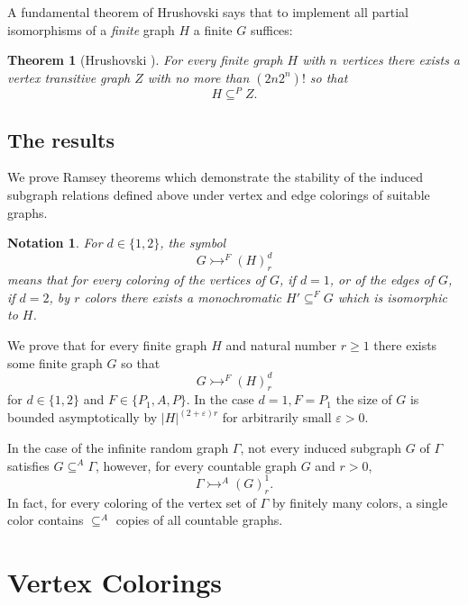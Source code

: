 \documentclass[11pt]{amsart}
\newcommand{\ars}{\rightarrowtail}
\newcommand{\su}{\subseteq}
\newtheorem*{notation}{Notation}
\newtheorem{theorem}{Theorem}[section]
\begin{document}
A fundamental theorem of Hrushovski \cite{H} says  that to implement all
partial isomorphisms of a \emph{finite} graph $H$  a finite $G$ suffices:

\begin{theorem}[Hrushovski \cite{H}]
For every finite graph $H$ with $n$ vertices there exists a vertex
transitive graph $Z$ with no more than $(2n2^n)!$ so that
\begin{equation}
H\su^P Z.
\end{equation}
\end{theorem}
 
\bigbreak

\subsection{The results}
We prove Ramsey theorems which demonstrate the stability of the
induced subgraph relations defined above under vertex and edge
colorings of suitable graphs.



\begin{notation}For $d\in \{1,2\}$,  the symbol 
\[G\ars^F(H)^d_r\]
 means that for every coloring of the vertices of $G$, if
$d=1$, or of the edges of $G$, if $d=2$,  by $r$
colors there exists a monochromatic $H'\su ^F G$ which is isomorphic
to $H$.
\end{notation}

We  prove that for every finite graph $H$ and natural number
$r\ge 1$ there exists some finite graph $G$ so that 
\begin{equation}
G\ars^F (H)^d_r
\end{equation} 
for $d\in\{1,2\}$ and $F\in\{P_1, A, P\}$. In the case $d=1,F=P_1$ the
size of $G$ is bounded asymptotically by $|H|^{(2+\varepsilon)r}$ for
arbitrarily small $\varepsilon>0$.


In the case of the infinite random graph $\Gamma$,  not
 every induced subgraph $G$ of $\Gamma$ satisfies $G\su ^A
\Gamma$, however,  for every countable graph $G$ and
$r>0$, 
\begin{equation}
\Gamma\ars^A(G)^1_r.
\end{equation}
In fact, for every coloring of the vertex set of $\Gamma$ by finitely
many colors, a single color  contains $\su^A$ copies of all
countable graphs. 







\section{Vertex Colorings}
\end{document}
